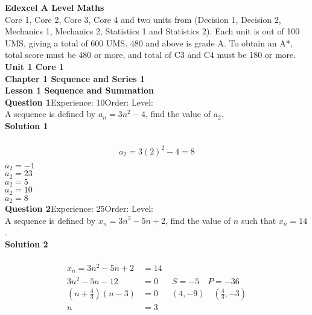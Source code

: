\documentclass{article}
\begin{document}
\noindent\Huge{\textbf{Edexcel A Level Maths}}\\[5pt]
\noindent\large{Core 1, Core 2, Core 3, Core 4 and two units from (Decision 1, Decision 2, Mechanics 1, Mechanics 2, Statistics 1 and Statistics 2).  Each unit is out of 100 UMS, giving a total of 600 UMS.  480 and above is grade A.  To obtain an A*, total score must be 480 or more, and total of C3 and C4 must be 180 or more.}\\[20pt]
\noindent\huge{\textbf{Unit 1 Core 1}}\\[18pt]
\noindent\huge{\textbf{Chapter 1 Sequence and Series 1}}\\[15pt]
\noindent\large{\textbf{Lesson 1 Sequence and Summation}}\\[12pt]
\noindent\textbf{Question 1}\hspace{20pt}Experience: 10\hspace{20pt}Order: \hspace{20pt}Level: \\[2pt]
A sequence is defined by $a_n=3n^2-4$, find the value of $a_2$.\\[4pt]
\noindent\textbf{Solution 1}\\[2pt]
\\[-10pt]\begin{align*}
a_2=3(2)^2-4=8\\[2pt]
\end{align*}
$a_2=-1$\\
$a_2=23$\\
$a_2=5$\\
$a_2=10$\\
$a_2=8$\\
\noindent\textbf{Question 2}\hspace{20pt}Experience: 25\hspace{20pt}Order: \hspace{20pt}Level: \\[2pt]
A sequence is defined by $x_n=3n^2-5n+2$, find the value of $n$ such that $x_n=14$.\\[4pt]
\noindent\textbf{Solution 2}\\[2pt]
\\[-10pt]\begin{align*}
x_n=3n^2-5n+2&=14\\[2pt]
3n^2-5n-12&=0 \hspace{20pt} S=-5 \quad P=-36\\[2pt]
\left(n+\displaystyle\frac{4}{3}\right)(n-3)&=0 \hspace{19pt} (4,-9) \quad \left(\displaystyle\frac{4}{3},-3\right)\\[2pt]
n&=3\\
\end{align*}
\end{document}
